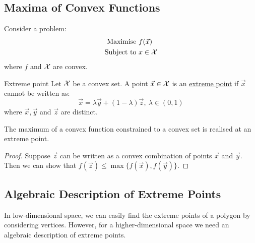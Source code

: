 \documentclass[../Main.tex]{subfiles}
\begin{document}
\subsection{Maxima of Convex Functions}
Consider a problem:
\begin{align*}
    \text{Maximise } &f(\vec{x}) \\
    \text{Subject to } &x \in \mathcal{X}
\end{align*}
where $f$ and $\mathcal{X}$ are convex.
\begin{definition}{Extreme point}
    Let $\mathcal{X}$ be a convex set. A point $\vec{x} \in \mathcal{X}$ is an \underline{extreme point} if $\vec{x}$ cannot be written as:
    \begin{equation*}
        \vec{x} = \lambda \vec{y} + (1-\lambda) \vec{z},~\lambda \in (0, 1)
    \end{equation*}
    where $\vec{x}, \vec{y}$ and $\vec{z}$ are distinct.
\end{definition}
\begin{theorem}
    The maximum of a convex function constrained to a convex set is realised at an extreme point.
\end{theorem}
\begin{proof}
    Suppose $\vec{z}$ can be written as a convex combination of points $\vec{x}$ and $\vec{y}$. Then we can show that $f(\vec{z}) \leq \max\{f(\vec{x}), f(\vec{y})\}$.
\end{proof}
\subsection{Algebraic Description of Extreme Points}
In low-dimensional space, we can easily find the extreme points of a polygon by considering vertices. However, for a higher-dimensional space we need an algebraic description of extreme points.

\end{document}
